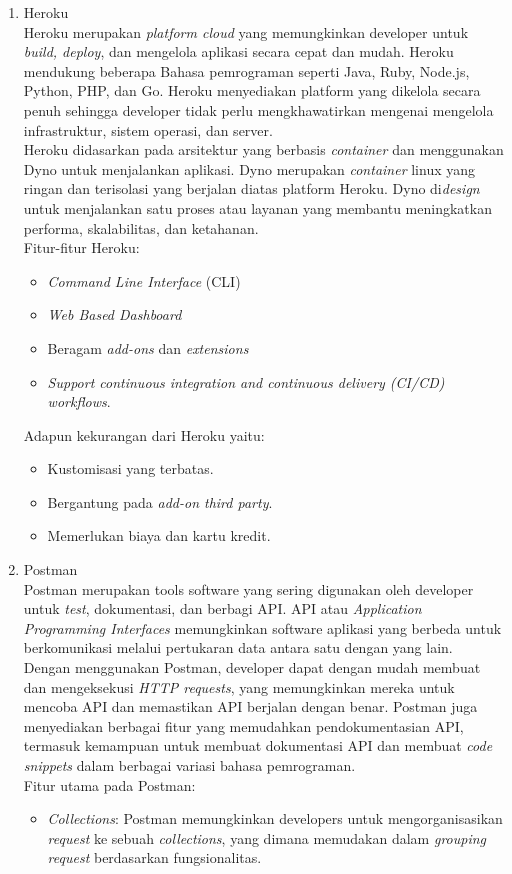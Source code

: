 \begin{enumerate}
	\item Heroku
	\\Heroku merupakan \textit{platform cloud} yang memungkinkan developer untuk \textit{build, deploy}, dan mengelola aplikasi secara cepat dan mudah. Heroku mendukung beberapa Bahasa pemrograman seperti Java, Ruby, Node.js, Python, PHP, dan Go. Heroku menyediakan platform yang dikelola secara penuh sehingga developer tidak perlu mengkhawatirkan mengenai mengelola infrastruktur, sistem operasi, dan server.
	\\Heroku didasarkan pada arsitektur yang berbasis \textit{container} dan menggunakan Dyno untuk menjalankan aplikasi. Dyno merupakan \textit{container} linux yang ringan dan terisolasi yang berjalan diatas platform Heroku. Dyno di\textit{design} untuk menjalankan satu proses atau layanan yang membantu meningkatkan performa, skalabilitas, dan ketahanan.
	\\Fitur-fitur Heroku:
	\begin{itemize}
		\item \textit{Command Line Interface }(CLI)
		\item \textit{Web Based Dashboard}
		\item Beragam \textit{add-ons} dan \textit{extensions}
		\item\textit{ Support continuous integration and continuous delivery (CI/CD) workflows}.
	\end{itemize}
	Adapun kekurangan dari Heroku yaitu:
	\begin{itemize}
		\item Kustomisasi yang terbatas.
		\item Bergantung pada \textit{add-on third party}.
		\item Memerlukan biaya dan kartu kredit.
	\end{itemize}

	\item Postman
	\\Postman merupakan tools software yang sering digunakan oleh developer untuk \textit{test}, dokumentasi, dan berbagi API. API atau \textit{Application Programming Interfaces} memungkinkan software aplikasi yang berbeda untuk berkomunikasi melalui pertukaran data antara satu dengan yang lain.
	\\Dengan menggunakan Postman, developer dapat dengan mudah membuat dan mengeksekusi \textit{HTTP requests}, yang memungkinkan mereka untuk mencoba API dan memastikan API berjalan dengan benar. Postman juga menyediakan berbagai fitur yang memudahkan pendokumentasian API, termasuk kemampuan untuk membuat dokumentasi API dan membuat \textit{code snippets} dalam berbagai variasi bahasa pemrograman.
	\\Fitur utama pada Postman:
	\begin{itemize}
		\item \textit{Collections}: Postman memungkinkan developers untuk mengorganisasikan \textit{request} ke sebuah \textit{collections}, yang dimana memudakan dalam \textit{grouping request} berdasarkan fungsionalitas. 
 		

\end{itemize}
\end{enumerate}
